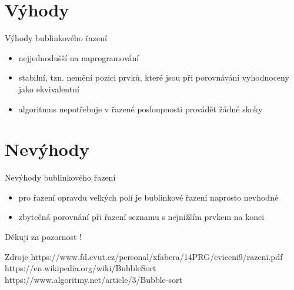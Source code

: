 \documentclass{beamer}
\begin{document}
\section{Výhody}
\begin{frame}{Výhody bublinkového řazení}
    \begin{itemize}
        \item nejjednodušší na naprogramování
        \item stabilní, tzn. nemění pozici prvků, které jsou při porovnávání vyhodnoceny jako ekvivalentní
        \item algoritmus nepotřebuje v řazené posloupnosti provádět žádné skoky
    \end{itemize}
\end{frame}
\section{Nevýhody}
\begin{frame}{Nevýhody bublinkového řazení}
    \begin{itemize}
        \item pro řazení opravdu velkých polí je bublinkové řazení naprosto nevhodné
        \item zbytečná porovnání při řazení seznamu s nejnižším prvkem na konci
    \end{itemize}
\end{frame}
\begin{frame}
\begin{center}
    \Large{Děkuji za pozornost !}
\end{center}
\end{frame}
\begin{frame}{Zdroje}
    https://www.fd.cvut.cz/personal/xfabera/14PRG/cviceni9/razeni.pdf\\
    https://en.wikipedia.org/wiki/BubbleSort\\
    https://www.algoritmy.net/article/3/Bubble-sort\\
\end{frame}
\end{document}
